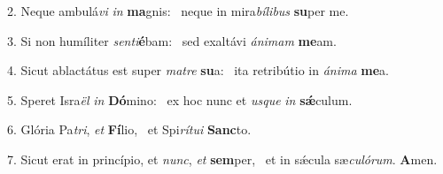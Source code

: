 2. Neque ambulá\textit{vi} \textit{in} \textbf{ma}gnis: \ast\  neque in mira\textit{bí}\textit{li}\textit{bus} \textbf{su}per me.\

3. Si non humíliter \textit{sen}\textit{ti}\textbf{é}bam: \ast\  sed exaltávi \textit{á}\textit{ni}\textit{mam} \textbf{me}am.\

4. Sicut ablactátus est super \textit{ma}\textit{tre} \textbf{su}a: \ast\  ita retribútio in \textit{á}\textit{ni}\textit{ma} \textbf{me}a.\

5. Speret Isra\textit{ël} \textit{in} \textbf{Dó}mino: \ast\  ex hoc nunc et \textit{us}\textit{que} \textit{in} \textbf{sǽ}culum.\

6. Glória Pa\textit{tri}, \textit{et} \textbf{Fí}lio, \ast\  et Spi\textit{rí}\textit{tu}\textit{i} \textbf{Sanc}to.\

7. Sicut erat in princípio, et \textit{nunc}, \textit{et} \textbf{sem}per, \ast\  et in sǽcula sæ\textit{cu}\textit{ló}\textit{rum}. \textbf{A}men.\


